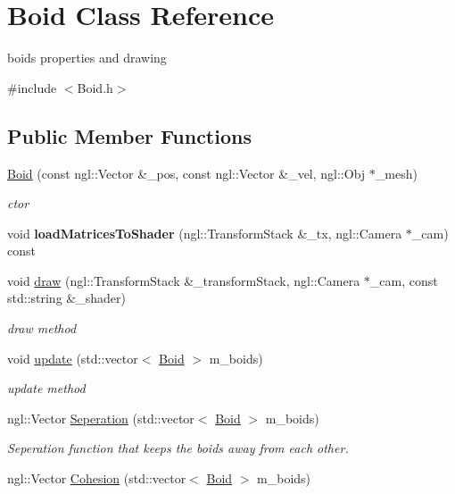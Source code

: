 \hypertarget{classBoid}{
\section{Boid Class Reference}
\label{classBoid}
}


boids properties and drawing  




{\ttfamily \#include $<$Boid.h$>$}

\subsection*{Public Member Functions}
\begin{DoxyCompactItemize}
\item 
\hyperlink{classBoid_ae6fcb04ea6225bcd5e37097b69ed0ef0}{Boid} (const ngl::Vector \&\_\-pos, const ngl::Vector \&\_\-vel, ngl::Obj $\ast$\_\-mesh)
\begin{DoxyCompactList}\small\item\em ctor \end{DoxyCompactList}\item 
\hypertarget{classBoid_aa385844611134b967c38e60a870e5109}{
void {\bfseries loadMatricesToShader} (ngl::TransformStack \&\_\-tx, ngl::Camera $\ast$\_\-cam) const }
\label{classBoid_aa385844611134b967c38e60a870e5109}

\item 
void \hyperlink{classBoid_a62b07b2a06fdca9061d05b3d6d3122f9}{draw} (ngl::TransformStack \&\_\-transformStack, ngl::Camera $\ast$\_\-cam, const std::string \&\_\-shader)
\begin{DoxyCompactList}\small\item\em draw method \end{DoxyCompactList}\item 
void \hyperlink{classBoid_a302007545e82cea5012f2e653e660232}{update} (std::vector$<$ \hyperlink{classBoid}{Boid} $>$ m\_\-boids)
\begin{DoxyCompactList}\small\item\em update method \end{DoxyCompactList}\item 
\hypertarget{classBoid_ab88f30d00599ecbe17403e60518ab3b5}{
ngl::Vector \hyperlink{classBoid_ab88f30d00599ecbe17403e60518ab3b5}{Seperation} (std::vector$<$ \hyperlink{classBoid}{Boid} $>$ m\_\-boids)}
\label{classBoid_ab88f30d00599ecbe17403e60518ab3b5}

\begin{DoxyCompactList}\small\item\em Seperation function that keeps the boids away from each other. \end{DoxyCompactList}\item 
\hypertarget{classBoid_a2be8f19fde4d038acb147d11fc3a679b}{
ngl::Vector \hyperlink{classBoid_a2be8f19fde4d038acb147d11fc3a679b}{Cohesion} (std::vector$<$ \hyperlink{classBoid}{Boid} $>$ m\_\-boids)}
\label{classBoid_a2be8f19fde4d038acb147d11fc3a679b}


\end{DoxyCompactItemize}
